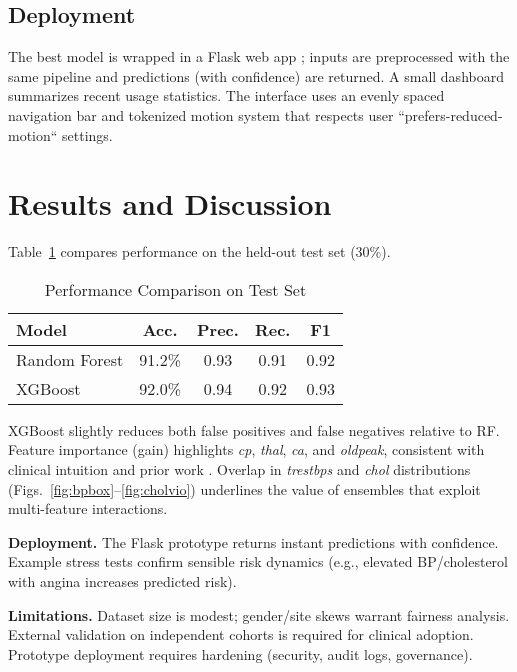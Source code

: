 \documentclass[conference]{IEEEtran}
\begin{document}
\subsection{Deployment}
The best model is wrapped in a Flask web app \cite{flaskdocs}; inputs are preprocessed with the same pipeline and predictions (with confidence) are returned. A small dashboard summarizes recent usage statistics. The interface uses an evenly spaced navigation bar and tokenized motion system that respects user ``prefers-reduced-motion`` settings.

\section{Results and Discussion}
Table~\ref{tab:perf} compares performance on the held-out test set (30\%).

\begin{table}[!t]
\centering
\caption{Performance Comparison on Test Set}
\label{tab:perf}
\begin{tabular}{@{}lcccc@{}}
\toprule
\textbf{Model} & \textbf{Acc.} & \textbf{Prec.} & \textbf{Rec.} & \textbf{F1} \\
\midrule
Random Forest & 91.2\% & 0.93 & 0.91 & 0.92 \\
XGBoost & 92.0\% & 0.94 & 0.92 & 0.93 \\
\bottomrule
\end{tabular}
\end{table}

XGBoost slightly reduces both false positives and false negatives relative to RF. Feature importance (gain) highlights \textit{cp}, \textit{thal}, \textit{ca}, and \textit{oldpeak}, consistent with clinical intuition and prior work \cite{zhang2021}. Overlap in \textit{trestbps} and \textit{chol} distributions (Figs.~\ref{fig:bpbox}--\ref{fig:cholvio}) underlines the value of ensembles that exploit multi-feature interactions.

\textbf{Deployment.} The Flask prototype returns instant predictions with confidence. Example stress tests confirm sensible risk dynamics (e.g., elevated BP/cholesterol with angina increases predicted risk).

\textbf{Limitations.} Dataset size is modest; gender/site skews warrant fairness analysis. External validation on independent cohorts is required for clinical adoption. Prototype deployment requires hardening (security, audit logs, governance).
\end{document}
